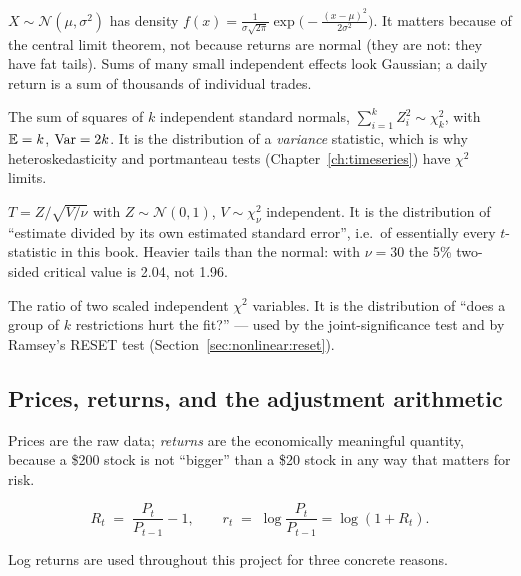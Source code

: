 \begin{description}[leftmargin=0pt,style=nextline]
  \item[Normal] $X\sim\mathcal N(\mu,\sigma^2)$ has density
    $f(x)=\frac{1}{\sigma\sqrt{2\pi}}\exp\!\bigl(-\frac{(x-\mu)^2}{2\sigma^2}\bigr)$.
    It matters because of the central limit theorem, not because returns are normal
    (they are not: they have fat tails). Sums of many small independent effects look
    Gaussian; a daily return is a sum of thousands of individual trades.
  \item[$\chi^2_k$] The sum of squares of $k$ independent standard normals,
    $\sum_{i=1}^k Z_i^2\sim\chi^2_k$, with $\mathbb{E}=k$, $\operatorname{Var}=2k$. It is the distribution of
    a \emph{variance} statistic, which is why heteroskedasticity and portmanteau tests
    (Chapter~\ref{ch:timeseries}) have $\chi^2$ limits.
  \item[$t_\nu$] $T=Z/\sqrt{V/\nu}$ with $Z\sim\mathcal N(0,1)$, $V\sim\chi^2_\nu$
    independent. It is the distribution of ``estimate divided by its own estimated
    standard error'', i.e.\ of essentially every $t$-statistic in this book. Heavier
    tails than the normal: with $\nu=30$ the 5\% two-sided critical value is 2.04, not
    1.96.
  \item[$F_{k,\nu}$] The ratio of two scaled independent $\chi^2$ variables. It is the
    distribution of ``does a group of $k$ restrictions hurt the fit?'' --- used by the
    joint-significance test and by Ramsey's RESET test
    (Section~\ref{sec:nonlinear:reset}).
\end{description}

\subsection{Prices, returns, and the adjustment arithmetic}
\label{sec:prob:returns}

Prices are the raw data; \emph{returns} are the economically meaningful quantity,
because a \$200 stock is not ``bigger'' than a \$20 stock in any way that matters for
risk.

\begin{definition}
\begin{equation}
  R_t \;=\; \frac{P_t}{P_{t-1}}-1,
  \qquad
  r_t \;=\; \log\frac{P_t}{P_{t-1}} = \log(1+R_t).
  \label{eq:returns}
\end{equation}
\end{definition}

Log returns are used throughout this project for three concrete reasons.

